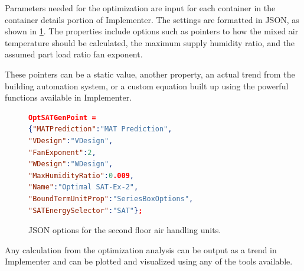 Parameters needed for the optimization are input for each container in
the container details portion of Implementer. The settings are formatted
in JSON, as shown in \figref{} \ref{fig:JSONOptions}. The properties
include options such as pointers to how the mixed air temperature
should be calculated, the maximum supply humidity ratio, and the
assumed part load ratio fan exponent. 

These pointers can be a static value, another property, an actual
trend from the building automation system, or a custom equation built up
using the powerful functions available in Implementer.

\begin{figure}
\centering
\begin{lstlisting}[language=json]
OptSATGenPoint = 
{"MATPrediction":"MAT Prediction",
"VDesign":"VDesign",
"FanExponent":2,
"WDesign":"WDesign",
"MaxHumidityRatio":0.009,
"Name":"Optimal SAT-Ex-2",
"BoundTermUnitProp":"SeriesBoxOptions",
"SATEnergySelector":"SAT"};
\end{lstlisting}
\caption{JSON options for the second floor air handling units. }
\label{fig:JSONOptions}
\end{figure}

Any calculation  from the optimization analysis can be output as a trend
in Implementer and can be plotted and visualized using any of the tools
available. 






